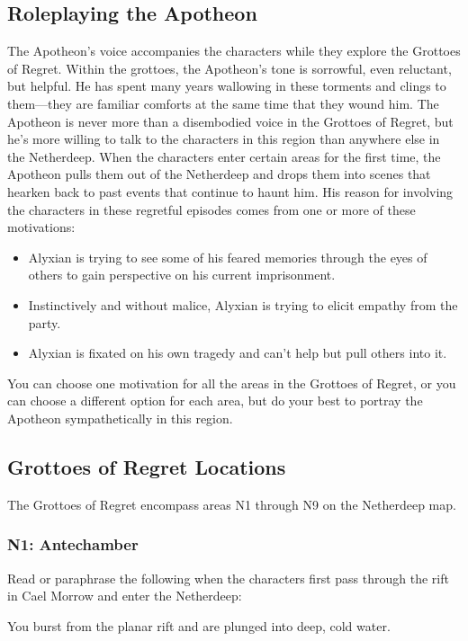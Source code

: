 \documentclass[10pt,a4,twoside,twocolumn,openany,nodeprecatedcode]{dndbook}
\begin{document}
\subsection{Roleplaying the Apotheon}
The Apotheon's voice accompanies the characters while they explore the Grottoes of Regret. Within the grottoes, the Apotheon's tone is sorrowful, even reluctant, but helpful. He has spent many years wallowing in these torments and clings to them—they are familiar comforts at the same time that they wound him.
The Apotheon is never more than a disembodied voice in the Grottoes of Regret, but he's more willing to talk to the characters in this region than anywhere else in the Netherdeep. When the characters enter certain areas for the first time, the Apotheon pulls them out of the Netherdeep and drops them into scenes that hearken back to past events that continue to haunt him. His reason for involving the characters in these regretful episodes comes from one or more of these motivations:
\begin{itemize}

\item Alyxian is trying to see some of his feared memories through the eyes of others to gain perspective on his current imprisonment.
\item Instinctively and without malice, Alyxian is trying to elicit empathy from the party.
\item Alyxian is fixated on his own tragedy and can't help but pull others into it.
\end{itemize}


You can choose one motivation for all the areas in the Grottoes of Regret, or you can choose a different option for each area, but do your best to portray the Apotheon sympathetically in this region.
\subsection{Grottoes of Regret Locations}
The Grottoes of Regret encompass areas N1 through N9 on the Netherdeep map.
\subsubsection{N1: Antechamber}
Read or paraphrase the following when the characters first pass through the rift in Cael Morrow and enter the Netherdeep:
\begin{DndReadAloud}{}
You burst from the planar rift and are plunged into deep, cold water.
\end{DndReadAloud}
\end{document}
